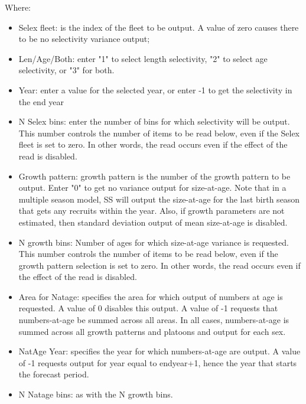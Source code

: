 Where:
\begin{itemize}
	\item Selex fleet:  is the index of the fleet to be output.  A value of zero causes there to be no selectivity variance output;
	\item Len/Age/Both:  enter "1" to select length selectivity, "2" to select age selectivity, or "3" for both.  
	
	\item Year:  enter a value for the selected year, or enter -1 to get the selectivity in the end year
	
	\item 	N Selex bins:  enter the number of bins for which selectivity will be output.  This number controls the number of items to be read below, even if the Selex fleet is set to zero.  In other words, the read occurs even if the effect of the read is disabled. 
	
	\item Growth pattern:  growth pattern is the number of the growth pattern to be output.  Enter "0" to get no variance output for size-at-age.   Note that in a multiple season model, SS will output the size-at-age for the last birth season that gets any recruits within the year.  Also, if growth parameters are not estimated, then standard deviation output of mean size-at-age is disabled.
	
	\item 	N growth bins:  Number of ages for which size-at-age variance is requested.  This number controls the number of items to be read below, even if the growth pattern selection is set to zero.   In other words, the read occurs even if the effect of the read is disabled.
	
	\item 	Area for Natage:  specifies the area for which output of numbers at age is requested.  A value of 0 disables this output.  A value of -1 requests that numbers-at-age be summed across all areas.  In all cases, numbers-at-age is summed across all growth patterns and platoons and output for each sex.
	
	\item 	NatAge Year:  specifies the year for which numbers-at-age are output.  A value of -1 requests output for year equal to endyear+1, hence the year that starts the forecast period.
	
	\item N Natage bins:  as with the N growth bins.
\end{itemize}



